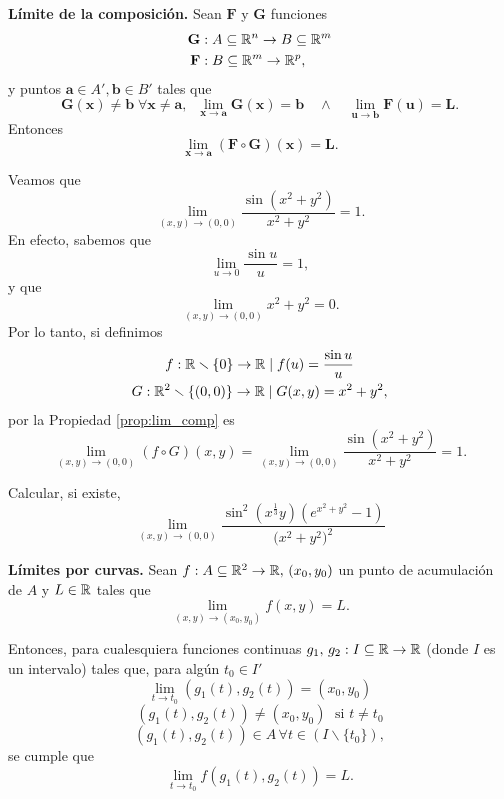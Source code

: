 \begin{propertie} \textbf{L\'imite de la composici\'on.} \label{prop:lim_comp} Sean $\mathbf{F}$ y $\mathbf{G}$ funciones 
\begin{align*}
 \mathbf{G} &:A  \subseteq  \mathbb{R}^n \to B  \subseteq  \mathbb{R}^m \\
 \mathbf{F} &:B  \subseteq  \mathbb{R}^m \to \mathbb{R}^p,
\end{align*}
y puntos $\mathbf{a} \in A', \mathbf{b} \in B'$ tales que 
\[
 \mathbf{G}(\mathbf{x})\neq  \mathbf{b} \; \forall  \mathbf{x}\neq\mathbf{a},    \;\; \lim_{\mathbf{x} \to \mathbf{a}} \mathbf{G}(\mathbf{x}) = \mathbf{b} \quad \wedge \quad \lim_{\mathbf{u} \to \mathbf{b}} \mathbf{F}(\mathbf{u}) = \mathbf{L}.
\]
Entonces
\[
 \lim_{\mathbf{x} \to \mathbf{a}} \left( \mathbf{F} \circ \mathbf{G} \right)(\mathbf{x}) = \mathbf{L}.
\]
\end{propertie}
\begin{example}
 Veamos que 
 \[
  \lim_{(x,y) \to (0,0)} \frac{\sin(x^2 + y^2)}{x^2 + y^2} = 1.
 \]
 En efecto, sabemos que 
  \[
    \lim_{u \to 0} \frac{\sin u}{u} = 1,
  \]
  y que
  \[
    \lim_{(x,y) \to (0,0)} x^2 + y^2 = 0.
  \]  
  Por lo tanto, si definimos 
  \begin{gather*}
   f: \mathbb{R} \smallsetminus \{0\} \to \mathbb{R} \;|\;f(u) = \frac{\sin u}{u} \\
   G: \mathbb{R}^2 \smallsetminus \{(0,0)\} \to \mathbb{R} \;|\; G(x,y) = x^2 + y^2,
  \end{gather*}
  por la Propiedad \ref{prop:lim_comp} es
  \[
   \lim_{(x,y) \to (0,0)} \left( f \circ G \right)(x,y) = 
   \lim_{(x,y) \to (0,0)} \frac{\sin(x^2 + y^2)}{x^2 + y^2} = 1.
  \]
\end{example}

\begin{tarea}  Calcular, si existe,   $$\lim_{(x,y)\rightarrow (0,0)}  \dfrac{\sin^{2}(x^{\frac{1}{3}}y)   (e^{ x^{2}+ y^{2} }-1)}{\big( x^{2}+y^{2} \big)^{2}}$$
\end{tarea}


\begin{corollary} \textbf{L\'imites por curvas.} \label{cor:lim_curva}
  Sean $f: A  \subseteq  \mathbb{R}^2 \to \mathbb{R}, \, (x_0,y_0)$ un punto de acumulaci\'on de $A$ y $L \in \mathbb{R}$ tales que 
  \[
   \lim_{(x,y) \to (x_0,y_0)} f(x,y) = L.
  \]

  Entonces, para cualesquiera funciones continuas $g_1, \, g_2 : I  \subseteq  \mathbb{R} \to \mathbb{R}$ (donde $I$ es un intervalo) tales que, para alg\'un $t_0 \in I'$
  \[
    \lim_{t \to t_0} \left( g_1(t),g_2(t) \right) = \left( x_0 , y_0 \right)
  \]
$$ \left( g_1(t),g_2(t) \right) \neq (x_0, y_0) \;\mbox{ si }  t\neq t_0$$
  $$\left( g_1(t), g_2(t) \right) \in A \, \forall t \in \left( I \smallsetminus \{t_0\} \right),$$ se cumple que
  \[
   \lim_{t \to t_0} f\left( g_1(t),g_2(t) \right) = L.
  \]
\end{corollary}


